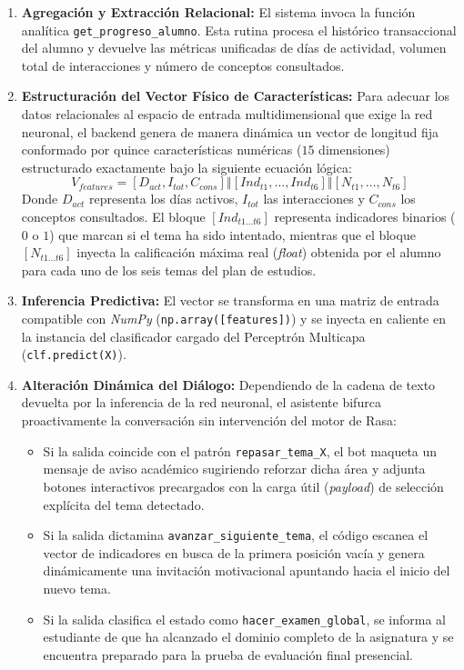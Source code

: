 \documentclass[a4paper,12pt,twoside,final]{book}
\begin{document}
\begin{enumerate}
    \item \textbf{Agregación y Extracción Relacional:} El sistema invoca la función analítica \texttt{get\_progreso\_alumno}. Esta rutina procesa el histórico transaccional del alumno y devuelve las métricas unificadas de días de actividad, volumen total de interacciones y número de conceptos consultados.
    \item \textbf{Estructuración del Vector Físico de Características:} Para adecuar los datos relacionales al espacio de entrada multidimensional que exige la red neuronal, el backend genera de manera dinámica un vector de longitud fija conformado por quince características numéricas ($15$ dimensiones) estructurado exactamente bajo la siguiente ecuación lógica:
    \begin{equation}
        V_{features} = [D_{act}, I_{tot}, C_{cons}] \mathbin{\Vert} [Ind_{t1}, \dots, Ind_{t6}] \mathbin{\Vert} [N_{t1}, \dots, N_{t6}]
    \end{equation}
    Donde $D_{act}$ representa los días activos, $I_{tot}$ las interacciones y $C_{cons}$ los conceptos consultados. El bloque $[Ind_{t1 \dots t6}]$ representa indicadores binarios ($0$ o $1$) que marcan si el tema ha sido intentado, mientras que el bloque $[N_{t1 \dots t6}]$ inyecta la calificación máxima real (\textit{float}) obtenida por el alumno para cada uno de los seis temas del plan de estudios.
    \item \textbf{Inferencia Predictiva:} El vector se transforma en una matriz de entrada compatible con \textit{NumPy} (\texttt{np.array([features])}) y se inyecta en caliente en la instancia del clasificador cargado del Perceptrón Multicapa (\texttt{clf.predict(X)}).
    \item \textbf{Alteración Dinámica del Diálogo:} Dependiendo de la cadena de texto devuelta por la inferencia de la red neuronal, el asistente bifurca proactivamente la conversación sin intervención del motor de Rasa:
    \begin{itemize}
        \item Si la salida coincide con el patrón \texttt{repasar\_tema\_X}, el bot maqueta un mensaje de aviso académico sugiriendo reforzar dicha área y adjunta botones interactivos precargados con la carga útil (\textit{payload}) de selección explícita del tema detectado.
        \item Si la salida dictamina \texttt{avanzar\_siguiente\_tema}, el código escanea el vector de indicadores en busca de la primera posición vacía y genera dinámicamente una invitación motivacional apuntando hacia el inicio del nuevo tema.
        \item Si la salida clasifica el estado como \texttt{hacer\_examen\_global}, se informa al estudiante de que ha alcanzado el dominio completo de la asignatura y se encuentra preparado para la prueba de evaluación final presencial.
    \end{itemize}
\end{enumerate}
\end{document}
